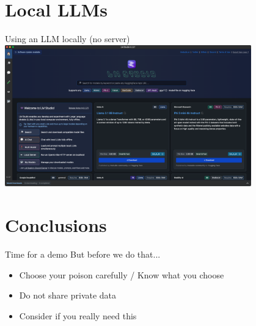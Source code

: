 \documentclass[t,xcolor={dvipsnames},final,aspectratio=169]{beamer}
\begin{document}
\section{Local LLMs}

{
\begin{frame}{Using an LLM locally (no server)}
\includegraphics[width=0.8\textwidth]{lmstudio.png}
\end{frame}
}

\section{Conclusions}
\begin{frame}{Time for a demo}
But before we do that...
\begin{itemize}
\item Choose your poison carefully / Know what you choose
\item Do not share private data
\item Consider if you really need this
\end{itemize}
\end{frame}
\end{document}
